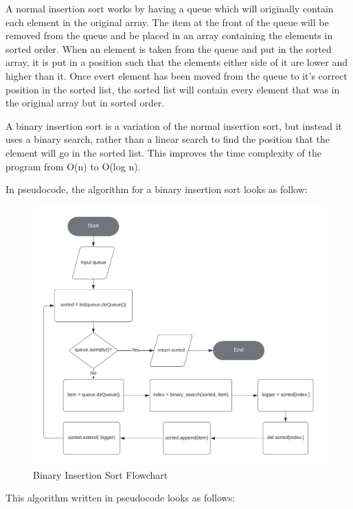 \documentclass[12pt]{article}
\begin{document}
A normal insertion sort works by having a queue which will originally contain each element in the original array. The item at the front of the queue will be removed from the queue and be placed in an array containing the elements in sorted order. When an element is taken from the queue and put in the sorted array, it is put in a position such that the elements either side of it are lower and higher than it. Once evert element has been moved from the queue to it's correct position in the sorted list, the sorted list will contain every element that was in the original array but in sorted order.

A binary insertion sort is a variation of the normal insertion sort, but instead it uses a binary search, rather than a linear search to find the position that the element will go in the sorted list. This improves the time complexity of the program from O(n) to O(log n).

In pseudocode, the algorithm for a binary insertion sort looks as follow:

\begin{figure}[h]
    \centering
    \captionsetup{justification=centering}
    \caption{Binary Insertion Sort Flowchart}
    \includegraphics[width=6in]{binary-insertion-sort-flowchart}
\end{figure}
\clearpage
This algorithm written in pseudocode looks as follows:
\end{document}
